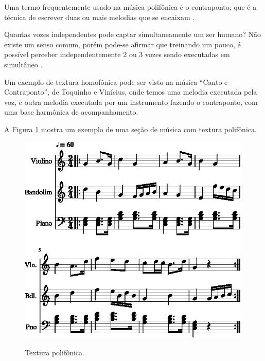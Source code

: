Uma termo frequentemente usado na música polifônica é o contraponto;
que é a técnica de escrever duas ou mais melodias que se encaixam 
\cite[pp. 29]{kerman2015listen} \cite[pp. 42]{bennett1993elementos}.

\begin{tcbinformation}{Quantas vozes independentes pode captar simultaneamente um ser humano?}
\label{ref:quantasvozes}
Não existe um senso comum, porém pode-se afirmar que treinando um pouco,
é possível perceber independentemente 2 ou 3 vozes sendo executadas em simultâneo \cite[pp. 81]{copland1974ouvir}. 
\end{tcbinformation} 

\begin{example}
Um exemplo de textura homofônica pode ser visto na música ``Canto e Contraponto'',
de Toquinho e Vinícius, 
onde temos uma melodia executada pela voz, e outra melodia executada por um instrumento fazendo o contraponto, 
com uma base harmônica de acompanhamento.
\end{example}

\begin{example}
A Figura \ref{fig:ex:polifonica} mostra um exemplo de uma seção de música com textura polifônica.
\end{example}

\begin{figure}[!h]
\centering
    \href{https://drive.google.com/file/d/1l-wd3TieQuacMAtdsNI6Z02YubePIGEV/view?usp=sharing}{\includegraphics[width=0.99\textwidth]{chapters/cap-musicalidade-percepcion/textura-polifonica-1.eps}}
  \caption{Textura polifônica.}
\label{fig:ex:polifonica}
\end{figure}



